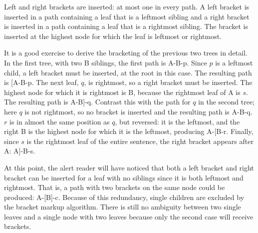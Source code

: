 \documentclass[11pt]{article}
\begin{document}
Left and right brackets are inserted: at most one
in every path. A left bracket is inserted in a path containing a leaf
that is a leftmost sibling and a right bracket is inserted in a path
containing a leaf that is a rightmost sibling. The bracket is inserted
at the highest node for which the leaf is leftmost or rightmost.

It is a good exercise to derive the bracketing of the previous two trees in detail.
In the first tree, with two B
siblings, the first path is A-B-p. Since $p$ is a leftmost child,
a left bracket must be inserted, at the root in this case. The
resulting path is [A-B-p. The next leaf, $q$, is rightmost, so a right
bracket must be inserted. The highest node for which it is rightmost
is B, because the rightmost leaf of A is $s$. The resulting path is
A-B]-q. Contrast this with the path for $q$ in the second tree; here $q$
is not rightmost, so no bracket is inserted and the resulting path is
A-B-q. $r$ is in almost the same position as $q$, but reversed: it is the
leftmost, and the right B is the highest node for which it is the
leftmost, producing A-[B-r. Finally, since $s$ is the rightmost leaf of
the entire sentence, the right bracket appears after A: A]-B-s.

At this point, the alert reader will have
noticed that both a left bracket and right bracket can be inserted for
a leaf with no siblings since it is both leftmost and rightmost. That is,
a path with two brackets on the same node could be produced: A-[B]-c. Because
of this redundancy, single children are
excluded by the bracket markup algorithm. There is still
no ambiguity between two single leaves and a single node with two
leaves because only the second case will receive brackets.



\end{document}
